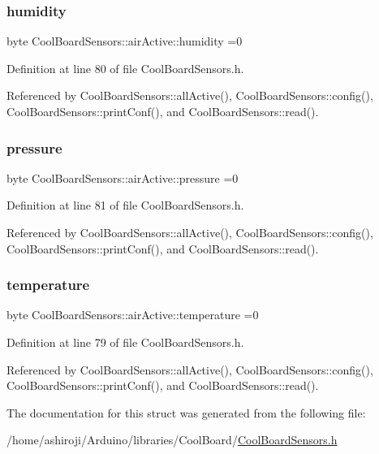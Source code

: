 \subsubsection{\texorpdfstring{humidity}{humidity}}
{\footnotesize\ttfamily byte Cool\+Board\+Sensors\+::air\+Active\+::humidity =0}



Definition at line 80 of file Cool\+Board\+Sensors.\+h.



Referenced by Cool\+Board\+Sensors\+::all\+Active(), Cool\+Board\+Sensors\+::config(), Cool\+Board\+Sensors\+::print\+Conf(), and Cool\+Board\+Sensors\+::read().

\mbox{\label{structCoolBoardSensors_1_1airActive_ab200826a70d1dc9945f5efb6b9c732ed}} 
\subsubsection{\texorpdfstring{pressure}{pressure}}
{\footnotesize\ttfamily byte Cool\+Board\+Sensors\+::air\+Active\+::pressure =0}



Definition at line 81 of file Cool\+Board\+Sensors.\+h.



Referenced by Cool\+Board\+Sensors\+::all\+Active(), Cool\+Board\+Sensors\+::config(), Cool\+Board\+Sensors\+::print\+Conf(), and Cool\+Board\+Sensors\+::read().

\mbox{\label{structCoolBoardSensors_1_1airActive_a9a6633c426b0508e30ebc1832ec6d745}} 
\subsubsection{\texorpdfstring{temperature}{temperature}}
{\footnotesize\ttfamily byte Cool\+Board\+Sensors\+::air\+Active\+::temperature =0}



Definition at line 79 of file Cool\+Board\+Sensors.\+h.



Referenced by Cool\+Board\+Sensors\+::all\+Active(), Cool\+Board\+Sensors\+::config(), Cool\+Board\+Sensors\+::print\+Conf(), and Cool\+Board\+Sensors\+::read().



The documentation for this struct was generated from the following file\+:\begin{DoxyCompactItemize}
\item 
/home/ashiroji/\+Arduino/libraries/\+Cool\+Board/\hyperlink{CoolBoardSensors_8h}{Cool\+Board\+Sensors.\+h}\end{DoxyCompactItemize}
